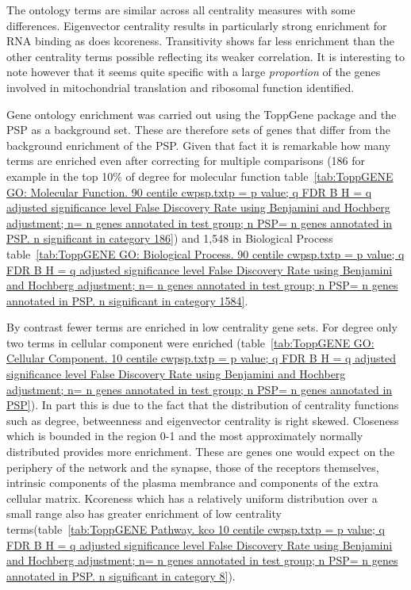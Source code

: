 The ontology terms are similar across all centrality measures with some differences. Eigenvector centrality results in particularly strong enrichment for RNA binding as does kcoreness. Transitivity shows far less enrichment than the other centrality terms possible reflecting its weaker correlation. It is interesting to note however that it seems quite specific with a large \textit{proportion} of the genes involved in mitochondrial translation and ribosomal function identified. 


Gene ontology enrichment was carried out using the ToppGene package and the PSP as a background set. These are therefore sets of genes that differ from the background enrichment of the PSP. Given that fact it is remarkable how many terms are enriched even after correcting for multiple comparisons (186 for example in the top 10\% of degree for molecular function table~\ref{tab:ToppGENE GO: Molecular Function. 90 centile cwpsp.txtp = p value; q FDR B H = q adjusted significance level False Discovery Rate using Benjamini and Hochberg adjustment; n= n genes annotated in test group; n PSP= n genes annotated in PSP. n significant in category 186}) and 1,548 in Biological Process table~\ref{tab:ToppGENE GO: Biological Process. 90 centile cwpsp.txtp = p value; q FDR B H = q adjusted significance level False Discovery Rate using Benjamini and Hochberg adjustment; n= n genes annotated in test group; n PSP= n genes annotated in PSP. n significant in category 1584}.

By contrast fewer terms are enriched in low centrality gene sets. For degree only two terms in cellular component were enriched (table~\ref{tab:ToppGENE GO: Cellular Component. 10 centile cwpsp.txtp = p value; q FDR B H = q adjusted significance level False Discovery Rate using Benjamini and Hochberg adjustment; n= n genes annotated in test group; n PSP= n genes annotated in PSP}). In part this is due to the fact that the distribution of centrality functions such as degree, betweenness and eigenvector centrality is right skewed. Closeness which is bounded in the region 0-1 and the most approximately normally distributed provides more enrichment. These are genes one would expect on the periphery of the network and the synapse, those of the receptors themselves, intrinsic components of the plasma membrance and components of the extra cellular matrix. Kcoreness which has a relatively uniform distribution over a small range also has greater enrichment of low centrality terms(table~\ref{tab:ToppGENE Pathway. kco 10 centile cwpsp.txtp = p value; q FDR B H = q adjusted significance level False Discovery Rate using Benjamini and Hochberg adjustment; n= n genes annotated in test group; n PSP= n genes annotated in PSP. n significant in category 8}).

